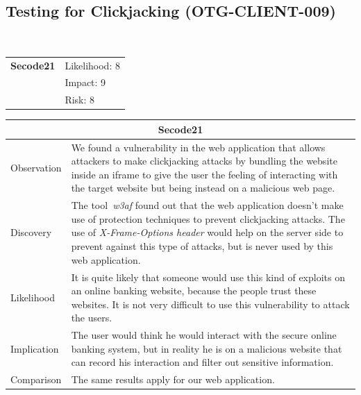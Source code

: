 \documentclass[headsepline,footsepline,footinclude=false,oneside,fontsize=11pt,paper=a4,listof=totoc,bibliography=totoc]{scrbook} %
\begin{document}
\subsection{Testing for Clickjacking (OTG-CLIENT-009)}\
\begin{tabular}{cR{12cm}}
	\textbf{Secode21} & Likelihood: 8\\& Impact: 9\\& Risk: 8
\end{tabular}

\begin{tabular}{ l|p{11cm}  }
	\hline
	\multicolumn{2}{c}{\textbf{Secode21}} \\
	\hline
	Observation   & We found a vulnerability in the web application that allows attackers to make clickjacking attacks by bundling the website inside an iframe to give the user the feeling of interacting with the target website but being instead on a malicious web page. \\
	Discovery  & The tool \textit{w3af} found out that the web application doesn't make use of protection techniques to prevent clickjacking attacks. The use of \textit{X-Frame-Options header} would help on the server side to prevent against this type of attacks, but is never used by this web application. \\
	Likelihood & It is quite likely that someone would use this kind of exploits on an online banking website, because the people trust these websites. It is not very difficult to use this vulnerability to attack the users. \\
	Implication    & The user would think he would interact with the secure online banking system, but in reality he is on a malicious website that can record his interaction and filter out sensitive information. \\
	Comparison & The same results apply for our web application. \\
	\hline
\end{tabular}
\\
\vspace{0.5cm}
\\
\end{document}
